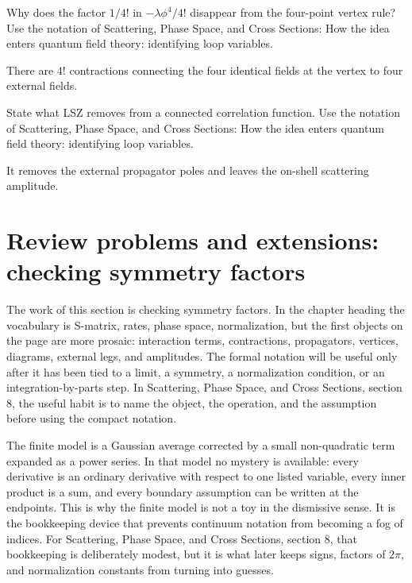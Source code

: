 \begin{exercise}
Why does the factor \(1/4!\) in \(-\lambda\phi^4/4!\) disappear from the four-point vertex rule?  Use the notation of Scattering, Phase Space, and Cross Sections: How the idea enters quantum field theory: identifying loop variables.
\begin{answer}
There are \(4!\) contractions connecting the four identical fields at the vertex to four external fields.
\end{answer}
\end{exercise}

\begin{exercise}
State what LSZ removes from a connected correlation function.  Use the notation of Scattering, Phase Space, and Cross Sections: How the idea enters quantum field theory: identifying loop variables.
\begin{answer}
It removes the external propagator poles and leaves the on-shell scattering amplitude.
\end{answer}
\end{exercise}



\section{Review problems and extensions: checking symmetry factors}

The work of this section is checking symmetry factors.  In the chapter heading the vocabulary is S-matrix, rates, phase space, normalization, but the first objects on the page are more prosaic: interaction terms, contractions, propagators, vertices, diagrams, external legs, and amplitudes.  The formal notation will be useful only after it has been tied to a limit, a symmetry, a normalization condition, or an integration-by-parts step.  In Scattering, Phase Space, and Cross Sections, section 8, the useful habit is to name the object, the operation, and the assumption before using the compact notation.

The finite model is a Gaussian average corrected by a small non-quadratic term expanded as a power series.  In that model no mystery is available: every derivative is an ordinary derivative with respect to one listed variable, every inner product is a sum, and every boundary assumption can be written at the endpoints.  This is why the finite model is not a toy in the dismissive sense.  It is the bookkeeping device that prevents continuum notation from becoming a fog of indices.  For Scattering, Phase Space, and Cross Sections, section 8, that bookkeeping is deliberately modest, but it is what later keeps signs, factors of \(2\pi\), and normalization constants from turning into guesses.

